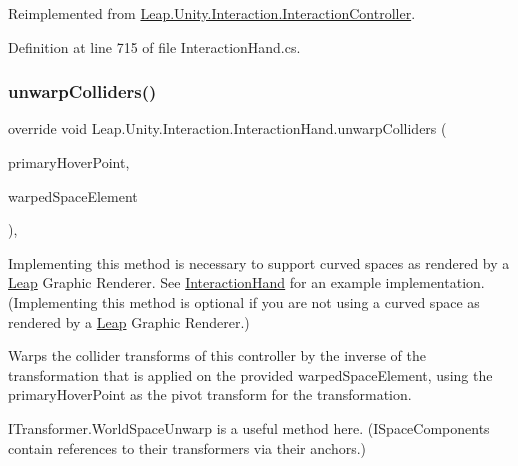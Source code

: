 Reimplemented from \mbox{\hyperlink{class_leap_1_1_unity_1_1_interaction_1_1_interaction_controller_a329e2f56f76c46d70a93b4508e867196}{Leap.\+Unity.\+Interaction.\+Interaction\+Controller}}.



Definition at line 715 of file Interaction\+Hand.\+cs.

\mbox{\label{class_leap_1_1_unity_1_1_interaction_1_1_interaction_hand_a223e3ae675f5017063a14f8f1305ed7a}} 
\subsubsection{\texorpdfstring{unwarpColliders()}{unwarpColliders()}}
{\footnotesize\ttfamily override void Leap.\+Unity.\+Interaction.\+Interaction\+Hand.\+unwarp\+Colliders (\begin{DoxyParamCaption}\item[{Transform}]{primary\+Hover\+Point,  }\item[{\mbox{\hyperlink{interface_leap_1_1_unity_1_1_space_1_1_i_space_component}{I\+Space\+Component}}}]{warped\+Space\+Element }\end{DoxyParamCaption})\hspace{0.3cm}{\ttfamily [protected]}, {\ttfamily [virtual]}}



Implementing this method is necessary to support curved spaces as rendered by a \mbox{\hyperlink{namespace_leap_1_1_unity_1_1_leap}{Leap}} Graphic Renderer. See \mbox{\hyperlink{class_leap_1_1_unity_1_1_interaction_1_1_interaction_hand}{Interaction\+Hand}} for an example implementation. (Implementing this method is optional if you are not using a curved space as rendered by a \mbox{\hyperlink{namespace_leap_1_1_unity_1_1_leap}{Leap}} Graphic Renderer.) 

Warps the collider transforms of this controller by the inverse of the transformation that is applied on the provided warped\+Space\+Element, using the primary\+Hover\+Point as the pivot transform for the transformation.

I\+Transformer.\+World\+Space\+Unwarp is a useful method here. (I\+Space\+Components contain references to their transformers via their anchors.)

